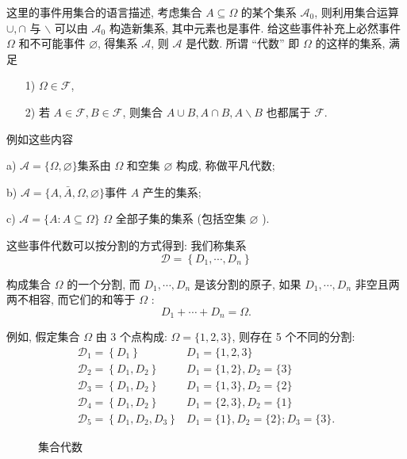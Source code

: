 这里的事件用集合的语言描述, 考虑集合 $A \subseteq \Omega$ 的某个集系 $\mathscr{A}_0$, 则利用集合运算 $\cup, \cap$ 与 $\backslash$ 可以由 $\mathscr{A}_0$ 构造新集系, 其中元素也是事件. 给这些事件补充上必然事件 $\Omega$ 和不可能事件 $\varnothing$, 得集系 $\mathscr{A}$, 则 $\mathcal{A}$ 是代数. 所谓 ``代数'' 即 $\Omega$ 的这样的集系, 满足
\begin{itemize}
    \item [1)] $\Omega \in \mathcal{F}$,
    \item    [2)] 若 $A \in \mathcal{F}, B \in \mathcal{F}$, 则集合 $A \cup B, A \cap B, A \backslash B$ 也都属于 $\mathcal{F}$.
\end{itemize}

例如这些内容
\begin{example}
    a) $\mathscr{A}=\{\Omega, \varnothing\}$集系由 $\Omega$ 和空集 $\varnothing$ 构成, 称做平凡代数;

b) $\mathscr{A}=\{A, \bar{A}, \Omega, \varnothing\}$事件 $A$ 产生的集系;

c) $\mathscr{A}=\{A: A \subseteq \Omega\}$ $\Omega$ 全部子集的集系 (包括空集 $\varnothing$ ).
\end{example}

这些事件代数可以按分割的方式得到: 我们称集系
$$
\mathscr{D}=\left\{D_1, \cdots, D_n\right\}
$$

构成集合 $\Omega$ 的一个分割, 而 $D_1, \cdots, D_n$ 是该分割的原子, 如果 $D_1, \cdots, D_n$ 非空且两两不相容, 而它们的和等于 $\Omega$ :
$$
D_1+\cdots+D_n=\Omega .
$$

例如, 假定集合 $\Omega$ 由 3 个点构成: $\Omega=\{1,2,3\}$, 则存在 5 个不同的分割:
$$
\begin{array}{ll}
\mathscr{D}_1=\left\{D_1\right\} & D_1=\{1,2,3\} \\
\mathscr{D}_2=\left\{D_1, D_2\right\} & D_1=\{1,2\}, D_2=\{3\} \\
\mathscr{D}_3=\left\{D_1, D_2\right\} & D_1=\{1,3\}, D_2=\{2\} \\
\mathscr{D}_4=\left\{D_1, D_2\right\} & D_1=\{2,3\}, D_2=\{1\} \\
\mathscr{D}_5=\left\{D_1, D_2, D_3\right\} & D_1=\{1\}, D_2=\{2\} ; D_3=\{3\} .
\end{array}
$$

\begin{wrapfigure}{l}{0.6\textwidth}
     
    \caption{集合代数}
    \label{fig:set-alg}
\end{wrapfigure}

